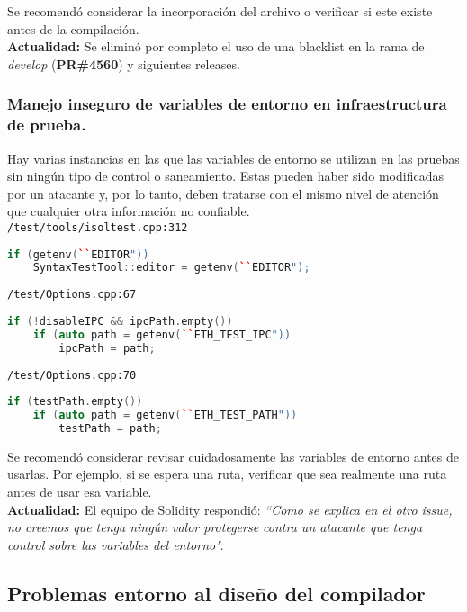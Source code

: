 Se recomendó considerar la incorporación del archivo o verificar si este existe antes de la compilación.\\

\textbf{Actualidad:} Se eliminó por completo el uso de una blacklist en la rama de \textit{develop} (\textbf{PR\#4560}\cite{GHPR4560}) y siguientes releases.\\

\subsubsection{Manejo inseguro de variables de entorno en infraestructura de prueba.}

Hay varias instancias en las que las variables de entorno se utilizan en las pruebas sin ningún tipo de control o saneamiento. Estas pueden haber sido modificadas por un atacante y, por lo tanto, deben tratarse con el mismo nivel de atención que cualquier otra información no confiable.\\

\verb|/test/tools/isoltest.cpp:312|
\begin{lstlisting}[language=c++]
if (getenv(``EDITOR"))
    SyntaxTestTool::editor = getenv(``EDITOR");
\end{lstlisting}

\verb|/test/Options.cpp:67|
\begin{lstlisting}[language=c++]
if (!disableIPC && ipcPath.empty())
    if (auto path = getenv(``ETH_TEST_IPC"))
        ipcPath = path;
\end{lstlisting}

\verb|/test/Options.cpp:70|
\begin{lstlisting}[language=c++]
if (testPath.empty())
    if (auto path = getenv(``ETH_TEST_PATH"))
        testPath = path;
\end{lstlisting}

Se recomendó considerar revisar cuidadosamente las variables de entorno antes de usarlas. Por ejemplo, si se espera una ruta, verificar que sea realmente una ruta antes de usar esa variable.\\

\textbf{Actualidad:} El equipo de Solidity respondió: \textit{``Como se explica en el otro issue, no creemos que tenga ningún valor protegerse contra un atacante que tenga control sobre las variables del entorno"}.\\

\subsection{Problemas entorno al diseño del compilador}


